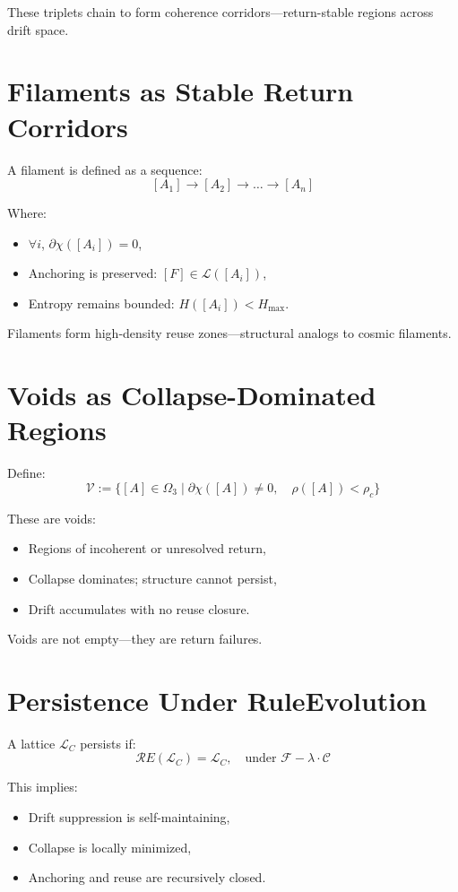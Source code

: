 These triplets chain to form coherence corridors—return-stable regions across drift space.

\section{Filaments as Stable Return Corridors} \label{sec:filaments}

A filament is defined as a sequence:
\[
[A_1] \to [A_2] \to \dots \to [A_n]
\]

Where:
\begin{itemize}
  \item $\forall i$, $\partial\chi([A_i]) = 0$,
  \item Anchoring is preserved: $[F] \in \mathcal{L}([A_i])$,
  \item Entropy remains bounded: $H([A_i]) < H_{\text{max}}$.
\end{itemize}

Filaments form high-density reuse zones—structural analogs to cosmic filaments.

\section{Voids as Collapse-Dominated Regions} \label{sec:voids}

Define:
\[
\mathcal{V} := \{ [A] \in \Omega_3 \mid \partial\chi([A]) \ne 0,\quad \rho([A]) < \rho_c \}
\]

These are voids:
\begin{itemize}
  \item Regions of incoherent or unresolved return,
  \item Collapse dominates; structure cannot persist,
  \item Drift accumulates with no reuse closure.
\end{itemize}

Voids are not empty—they are return failures.

\section{Persistence Under RuleEvolution} \label{sec:lattice-persistence}

A lattice $\mathcal{L}_C$ persists if:
\[
\mathcal{R}E(\mathcal{L}_C) = \mathcal{L}_C,\quad \text{under } \mathcal{F} - \lambda \cdot \mathcal{C}
\]

This implies:
\begin{itemize}
  \item Drift suppression is self-maintaining,
  \item Collapse is locally minimized,
  \item Anchoring and reuse are recursively closed.
\end{itemize}

